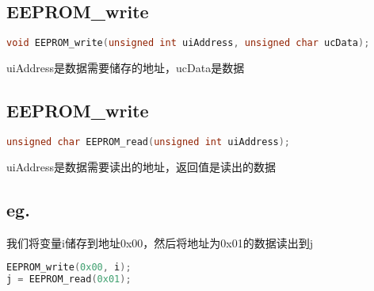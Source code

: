\documentclass{article}
\begin{document}
\subsection{EEPROM\_write}
\begin{lstlisting}[language=C]
void EEPROM_write(unsigned int uiAddress, unsigned char ucData);
\end{lstlisting}
uiAddress是数据需要储存的地址，ucData是数据
\subsection{EEPROM\_write}
\begin{lstlisting}[language=C]
unsigned char EEPROM_read(unsigned int uiAddress);
\end{lstlisting}
uiAddress是数据需要读出的地址，返回值是读出的数据
\subsection{eg.}
我们将变量i储存到地址0x00，然后将地址为0x01的数据读出到j
\begin{lstlisting}[language=C]
EEPROM_write(0x00, i);
j = EEPROM_read(0x01);
\end{lstlisting}
\end{document}
